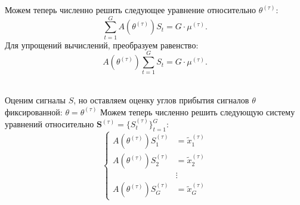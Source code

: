\documentclass[11pt]{article}
\begin{document}
Можем теперь численно решить следующее уравнение относительно $\theta^{(\tau)}$:
\begin{equation}
\sum_{t=1}^G A(\theta^{(\tau)})S_t = G \cdot \mu^{(\tau)}.
\end{equation}
Для упрощений вычислений, преобразуем равенство:
\begin{equation}
A(\theta^{(\tau)}) \sum_{t=1}^G S_t = G \cdot \mu^{(\tau)}.
\end{equation}
\\
\begin{center}
\fontsize{14}{18}\selectfont {}
\end{center}
Оценим сигналы $S$, но оставляем оценку углов прибытия сигналов $\theta$ фиксированной: $\theta = \theta^{(\tau)}$
Можем теперь численно решить следующую систему уравнений относительно $\mathbf{S}^{(\tau)}=\{S_t^{(\tau)}\}_{t=1}^G$:
\begin{equation}
\left\{
\begin{aligned}
A(\theta^{(\tau)}) S_1^{(\tau)} &= \widetilde{x}_1^{(\tau)} \\
A(\theta^{(\tau)}) S_2^{(\tau)} &= \widetilde{x}_2^{(\tau)} \\
&\vdots \\
A(\theta^{(\tau)}) S_G^{(\tau)} &= \widetilde{x}_G^{(\tau)}
\end{aligned}
\right.
\end{equation}
\begin{center}
\fontsize{16}{20}\selectfont {}
\end{center}
\begin{center}
\fontsize{14}{18}\selectfont {}
\end{center}
\begin{center}
\fontsize{14}{18}\selectfont {}
\end{center}
\begin{center}
\fontsize{14}{18}\selectfont {}
\end{center}
\begin{center}
\fontsize{14}{18}\selectfont {}
\end{center}
\begin{center}
\fontsize{16}{20}\selectfont {}
\end{center}
\end{document}
